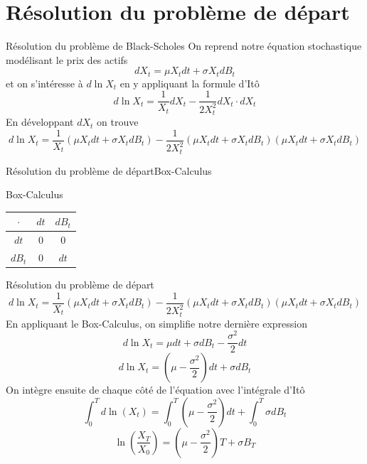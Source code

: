 \documentclass{beamer}
\newcommand{\1}{\mathmybb{1}}
\begin{document}
     \section{Résolution du problème de départ}
   \begin{frame}{Résolution du problème de Black-Scholes}
     On reprend notre équation stochastique modélisant le prix des actifs
     \begin{equation}
       dX_{t} = \mu X_{t} dt + \sigma X_{t} dB_{t}
     \end{equation}
     \pause
     et on s'intéresse à $d \ln X_{t}$ en y appliquant la formule d'Itô
     \[
       d \ln X_{t} = \frac{1}{X_{t}} dX_{t} - \frac{1}{2X^{2}_{t}} dX_{t} \cdot dX_{t}
     \]
     \pause
     En développant $dX_{t}$ on trouve
     \[
       d \ln X_{t} = \frac{1}{X_{t}} \left( \mu X_{t} dt + \sigma X_{t} dB_{t} \right) - \frac{1}{2X_{t}^{2}} \left( \mu X_{t} dt + \sigma X_{t} dB_{t} \right) \left( \mu X_{t}dt + \sigma X_{t} dB_{t}\right)
     \]
     \end{frame}
    \begin{frame}{Résolution du problème de départ}{Box-Calculus}
       \begin{block}{Box-Calculus}
         \begin{center}
           \begin{tabular}{|c|c|c|}
             \hline
             $\cdot$ & $dt$ & $dB_t$ \\
             \hline
             $dt$ & 0 & 0 \\
             $dB_{t}$ & 0 & $dt$ \\
             \hline
           \end{tabular}
         \end{center}
         \end{block}
       \end{frame}
       \begin{frame}{Résolution du problème de départ}
    \[
       d \ln X_{t} = \frac{1}{X_{t}} \left( \mu X_{t} dt + \sigma X_{t} dB_{t} \right) - \frac{1}{2X_{t}^{2}} \left( \mu X_{t} dt + \sigma X_{t} dB_{t} \right) \left( \mu X_{t}dt + \sigma X_{t} dB_{t}\right)
     \]
     \pause
     En appliquant le Box-Calculus, on simplifie notre dernière expression
    \[
       d \ln X_{t} =  \mu dt + \sigma dB_{t} - \frac{\sigma^{2}}{2} dt
     \]
     \[
       d \ln X_{t} = \left( \mu - \frac{\sigma^{2}}{2} \right) dt + \sigma dB_{t}
     \]
     \pause
     On intègre ensuite de chaque côté de l'équation avec l'intégrale d'Itô
     \[
       \int_{0}^{T} d \ln \left(  X_{t} \right) = \int_{0}^{T} \left(\mu - \frac{\sigma^{2}}{2} \right) dt + \int_{0}^{T} \sigma dB_{t}
     \]
     \pause
     \[
       \ln \left(\frac{X_{T}}{X_{0}} \right) = \left( \mu - \frac{\sigma^{2}}{2} \right) T + \sigma B_{T}
     \]
        \end{frame}
\end{document}
